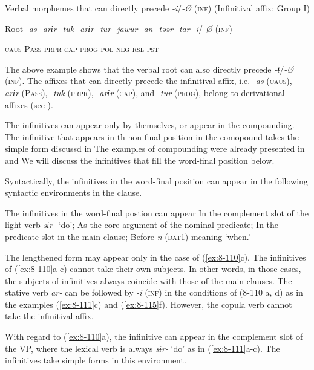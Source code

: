 \ea\label{ex:8-109}
  Verbal morphemes that can directly precede \textit{{}-i}/\textit{{}-Ø} (\textsc{inf}) (Infinitival affix; Group I)

  Root  \textit{{}-as  {}-arɨr  {}-tuk  {}-arɨr  {}-tur  {}-jawur  {}-an  {}-təər  {}-tar  {}-i}/\textit{{}-Ø} (\textsc{inf})

    \textsc{caus}  P\textsc{ass}  \textsc{prpr}  \textsc{cap}  \textsc{prog}  \textsc{pol}  \textsc{neg}  \textsc{rsl}  \textsc{pst}

The above example shows that the verbal root can also directly precede \textit{{}-ɨ}/\textit{{}-Ø} (\textsc{inf}). The affixes that can directly precede the infinitival affix, i.e. \textit{{}-as} (\textsc{caus}), \textit{{}-arɨr} (P\textsc{ass}), \textit{{}-tuk} (\textsc{prpr}), \textit{{}-arɨr} (\textsc{cap}), and \textit{{}-tur} (\textsc{prog}), belong to derivational affixes (see ).

  The infinitives can appear only by themselves, or appear in the compounding. The infinitive that appears in th non-final position in the comopound takes the simple form discussd in  The examples of compounding were already presented in  and  We will discuss the infinitives that fill the word-final position below.

  Syntactically, the infinitives in the word-final position can appear in the following syntactic environments in the clause.

\ea\label{ex:8-110}
  The infinitives in the word-final postion can appear
\ea In the complement slot of the light verb \textit{sɨr-} ‘do’;
\ex As the core argument of the nominal predicate;
\ex In the predicate slot in the main clause;
\ex Before \textit{n} (\textsc{dat}1) meaning ‘when.’
\z
\z

The lengthened form may appear only in the case of (\ref{ex:8-110}c). The infinitives of (\ref{ex:8-110}a-c) cannot take their own subjects. In other words, in those cases, the subjects of infinitives always coincide with those of the main clauses. The stative verb \textit{ar-} can be followed by \textit{{}-i} (\textsc{inf}) in the conditions of (8-110 a, d) as in the examples (\ref{ex:8-111}c) and (\ref{ex:8-115}f). However, the copula verb cannot take the infinitival affix.

With regard to (\ref{ex:8-110}a), the infinitive can appear in the complement slot of the VP, where the lexical verb is always \textit{sɨr-} ‘do’ as in (\ref{ex:8-111}a-c). The infinitives take simple forms in this environment.

